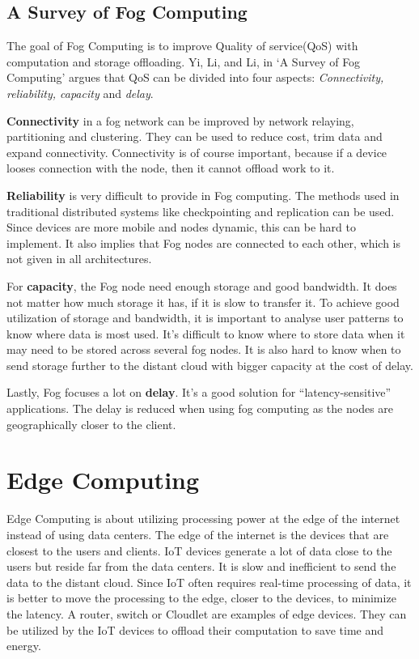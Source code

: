 \subsection{A Survey of Fog Computing} %
The goal of Fog Computing is to improve Quality of service(QoS) with computation and storage offloading. Yi, Li, and Li, in ‘A Survey of Fog Computing’\cite{yi_survey_2015} argues that QoS can be divided into four aspects: \textit{Connectivity, reliability, capacity } and \textit{delay}.

\textbf{Connectivity} in a fog network can be improved by network relaying, partitioning and clustering. They can be used to reduce cost, trim data and expand connectivity. Connectivity is of course important, because if a device looses connection with the node, then it cannot offload work to it. 

\textbf{Reliability} is very difficult to provide in Fog computing. The methods used in traditional distributed systems like checkpointing and replication can be used. Since devices are more mobile and nodes dynamic, this can be hard to implement. It also implies that Fog nodes are connected to each other, which is not given in all architectures. 

For \textbf{capacity}, the Fog node need enough storage and good bandwidth. It does not matter how much storage it has, if it is slow to transfer it. To achieve good utilization of storage and bandwidth, it is important to analyse user patterns to know where data is most used. It’s difficult to know where to store data when it may need to be stored across several fog nodes. It is also hard to know when to send storage further to the distant cloud with bigger capacity at the cost of delay. 

Lastly, Fog focuses a lot on \textbf{delay}. It’s a good solution for “latency-sensitive” applications. The delay is reduced when using fog computing as the nodes are geographically closer to the client.















\section{Edge Computing}
Edge Computing is about utilizing processing power at the edge of the internet instead of using data centers. The edge of the internet is the devices that are closest to the users and clients. IoT devices generate a lot of data close to the users but reside far from the data centers. It is slow and inefficient to send the data to the distant cloud. Since IoT often requires real-time processing of data, it is better to move the processing to the edge, closer to the devices, to minimize the latency\cite{shi_edge_2016}.
A router, switch or Cloudlet are examples of edge devices. They can be utilized by the IoT devices to offload their computation to save time and energy.





